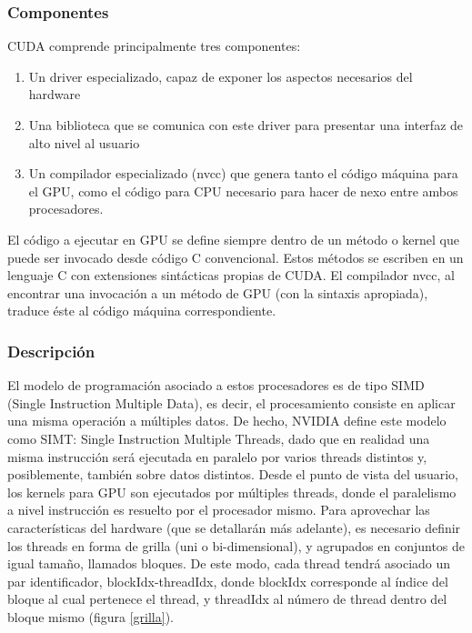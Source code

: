 \documentclass[a4paper,10pt]{report}
\begin{document}
\subsubsection{Componentes}
CUDA comprende principalmente tres componentes:
\begin{enumerate}
\item Un driver especializado, capaz de exponer los aspectos necesarios del hardware
\item Una biblioteca que se comunica con este driver para presentar una interfaz de alto nivel al usuario
\item Un compilador especializado (nvcc) que genera tanto el código máquina para el GPU, como el código para CPU necesario para hacer de nexo entre ambos procesadores.
\end{enumerate}

El código a ejecutar en GPU se define siempre dentro de un método o kernel que puede ser invocado
desde código C convencional. Estos métodos se escriben en un lenguaje C con extensiones sintácticas
propias de CUDA. El compilador nvcc, al encontrar una invocación a un método de GPU (con la sintaxis
apropiada), traduce éste al código máquina correspondiente.

\subsubsection{Descripción}
El modelo de programación asociado a estos procesadores es de tipo SIMD (Single Instruction Multiple Data), es decir, el procesamiento consiste en aplicar una misma operación a múltiples datos.
De hecho, NVIDIA define este modelo como SIMT: Single Instruction Multiple Threads, dado que en
realidad una misma instrucción será ejecutada en paralelo por varios threads distintos y, posiblemente, también sobre datos distintos.
Desde el punto de vista del usuario, los kernels para GPU son ejecutados por múltiples threads,
donde el paralelismo a nivel instrucción es resuelto por el procesador mismo. Para aprovechar las características del hardware (que se detallarán más adelante), es necesario definir los threads en forma de
grilla (uni o bi-dimensional), y agrupados en conjuntos de igual tamaño, llamados bloques. De este modo, cada thread tendrá asociado un par identificador, blockIdx-threadIdx, donde blockIdx corresponde al 
índice del bloque al cual pertenece el thread, y threadIdx al número de thread dentro del bloque mismo (figura \ref{grilla}).
\end{document}
